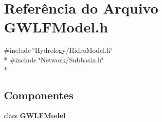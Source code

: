 \section{Referência do Arquivo G\+W\+L\+F\+Model.\+h}
\label{_g_w_l_f_model_8h}
{\ttfamily \#include \char`\"{}Hydrology/\+Hidro\+Model.\+h\char`\"{}}\\*
{\ttfamily \#include \char`\"{}Network/\+Subbasin.\+h\char`\"{}}\\*
\subsection*{Componentes}
\begin{DoxyCompactItemize}
\item 
class {\bf G\+W\+L\+F\+Model}
\end{DoxyCompactItemize}
